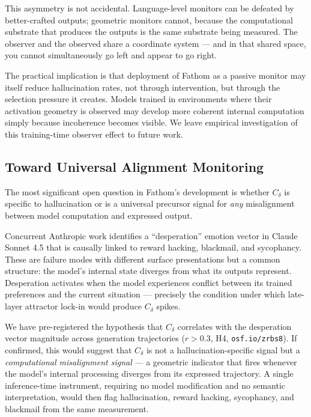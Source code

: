 \documentclass{article}
\begin{document}
This asymmetry is not accidental. Language-level monitors can be defeated by better-crafted outputs; geometric monitors cannot, because the computational substrate that produces the outputs is the same substrate being measured. The observer and the observed share a coordinate system --- and in that shared space, you cannot simultaneously go left and appear to go right.

The practical implication is that deployment of Fathom as a passive monitor may itself reduce hallucination rates, not through intervention, but through the selection pressure it creates. Models trained in environments where their activation geometry is observed may develop more coherent internal computation simply because incoherence becomes visible. We leave empirical investigation of this training-time observer effect to future work.

\subsection{Toward Universal Alignment Monitoring}

The most significant open question in Fathom's development is whether $C_\delta$ is specific to hallucination or is a universal precursor signal for \emph{any} misalignment between model computation and expressed output.

Concurrent Anthropic work \citep{lindsey2026emotions} identifies a ``desperation'' emotion vector in Claude Sonnet 4.5 that is causally linked to reward hacking, blackmail, and sycophancy. These are failure modes with different surface presentations but a common structure: the model's internal state diverges from what its outputs represent. Desperation activates when the model experiences conflict between its trained preferences and the current situation --- precisely the condition under which late-layer attractor lock-in would produce $C_\delta$ spikes.

We have pre-registered the hypothesis that $C_\delta$ correlates with the desperation vector magnitude across generation trajectories ($r > 0.3$, H4, \texttt{osf.io/zrbs8}). If confirmed, this would suggest that $C_\delta$ is not a hallucination-specific signal but a \emph{computational misalignment signal} --- a geometric indicator that fires whenever the model's internal processing diverges from its expressed trajectory. A single inference-time instrument, requiring no model modification and no semantic interpretation, would then flag hallucination, reward hacking, sycophancy, and blackmail from the same measurement.
\end{document}
